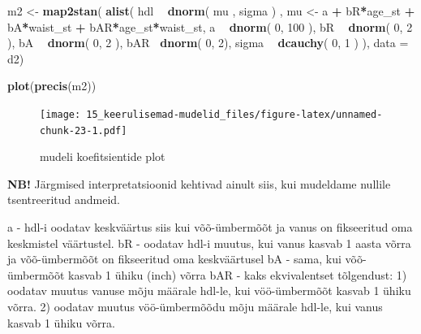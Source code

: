 \documentclass[]{book}
\newenvironment{Shaded}{\begin{snugshade}}{\end{snugshade}}
\newcommand{\DataTypeTok}[1]{\textcolor[rgb]{0.13,0.29,0.53}{#1}}
\newcommand{\DecValTok}[1]{\textcolor[rgb]{0.00,0.00,0.81}{#1}}
\newcommand{\KeywordTok}[1]{\textcolor[rgb]{0.13,0.29,0.53}{\textbf{#1}}}
\newcommand{\NormalTok}[1]{#1}
\newcommand{\OperatorTok}[1]{\textcolor[rgb]{0.81,0.36,0.00}{\textbf{#1}}}
\newcommand{\StringTok}[1]{\textcolor[rgb]{0.31,0.60,0.02}{#1}}
\begin{document}
\begin{Shaded}
\begin{Highlighting}[]
\NormalTok{m2 <-}\StringTok{ }\KeywordTok{map2stan}\NormalTok{(}
    \KeywordTok{alist}\NormalTok{(}
\NormalTok{        hdl }\OperatorTok{~}\StringTok{ }\KeywordTok{dnorm}\NormalTok{( mu , sigma ) ,}
\NormalTok{        mu <-}\StringTok{ }\NormalTok{a }\OperatorTok{+}\StringTok{ }\NormalTok{bR}\OperatorTok{*}\NormalTok{age_st }\OperatorTok{+}\StringTok{ }\NormalTok{bA}\OperatorTok{*}\NormalTok{waist_st }\OperatorTok{+}\StringTok{ }\NormalTok{bAR}\OperatorTok{*}\NormalTok{age_st}\OperatorTok{*}\NormalTok{waist_st,}
\NormalTok{        a }\OperatorTok{~}\StringTok{ }\KeywordTok{dnorm}\NormalTok{( }\DecValTok{0}\NormalTok{, }\DecValTok{100}\NormalTok{ ),}
\NormalTok{        bR }\OperatorTok{~}\StringTok{ }\KeywordTok{dnorm}\NormalTok{( }\DecValTok{0}\NormalTok{, }\DecValTok{2}\NormalTok{ ),}
\NormalTok{        bA }\OperatorTok{~}\StringTok{ }\KeywordTok{dnorm}\NormalTok{( }\DecValTok{0}\NormalTok{, }\DecValTok{2}\NormalTok{ ),}
\NormalTok{        bAR}\OperatorTok{~}\StringTok{ }\KeywordTok{dnorm}\NormalTok{( }\DecValTok{0}\NormalTok{, }\DecValTok{2}\NormalTok{),}
\NormalTok{        sigma }\OperatorTok{~}\StringTok{ }\KeywordTok{dcauchy}\NormalTok{( }\DecValTok{0}\NormalTok{, }\DecValTok{1}\NormalTok{ )}
\NormalTok{), }\DataTypeTok{data =}\NormalTok{ d2)}
\end{Highlighting}
\end{Shaded}

\begin{Shaded}
\begin{Highlighting}[]
\KeywordTok{plot}\NormalTok{(}\KeywordTok{precis}\NormalTok{(m2))}
\end{Highlighting}
\end{Shaded}

\begin{figure}
\centering
\texttt{[image: 15\_keerulisemad-mudelid\_files/figure-latex/unnamed-chunk-23-1.pdf]}
\caption{\label{fig:unnamed-chunk-23}mudeli koefitsientide plot}
\end{figure}

\textbf{NB!} Järgmised interpretatsioonid kehtivad ainult siis, kui mudeldame nullile tsentreeritud andmeid.

a - hdl-i oodatav keskväärtus siis kui võõ-ümbermõõt ja vanus on fikseeritud oma keskmistel väärtustel.
bR - oodatav hdl-i muutus, kui vanus kasvab 1 aasta võrra ja võõ-ümbermõõt on fikseeritud oma keskväärtusel
bA - sama, kui võõ-ümbermõõt kasvab 1 ühiku (inch) võrra
bAR - kaks ekvivalentset tõlgendust: 1) oodatav muutus vanuse mõju määrale hdl-le, kui vöö-ümbermõõt kasvab 1 ühiku võrra. 2) oodatav muutus vöö-ümbermõõdu mõju määrale hdl-le, kui vanus kasvab 1 ühiku võrra.
\end{document}
